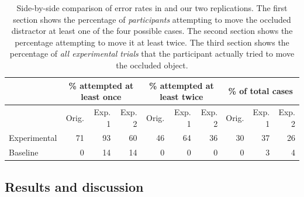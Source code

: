 \documentclass[10pt,letterpaper]{article}
\begin{document}



\begin{table}
\begin{center}
\begin{tabular}{ p{2cm} | r | r |  r || r | r | r || r | r | r}
& \multicolumn{3}{c||}{\% attempted at least once} & \multicolumn{3}{c||}{\% attempted at least twice} & \multicolumn{3}{c}{\% of total cases}\\
\hline
& Orig. & Exp. 1 & Exp. 2 & Orig. & Exp. 1 & Exp. 2 & Orig. & Exp. 1 & Exp. 2  \\
Experimental & 71 & 93 & 60 & 46 & 64 & 36 & 30 & 37 & 26\\
Baseline & 0 & 14 & 14 & 0 & 0 & 0 & 0 & 3 & 4\\
\end{tabular}
\caption{Side-by-side comparison of error rates in  and our two replications. The first section shows the percentage of \emph{participants} attempting to move the occluded distractor at least one of the four possible cases. The second section shows the percentage attempting to move it at least twice. The third section shows the percentage of \emph{all experimental trials} that the participant actually tried to move the occluded object. }
\label{table:mainResults}
\end{center}
\end{table}


\subsection{Results and discussion}
\end{document}
